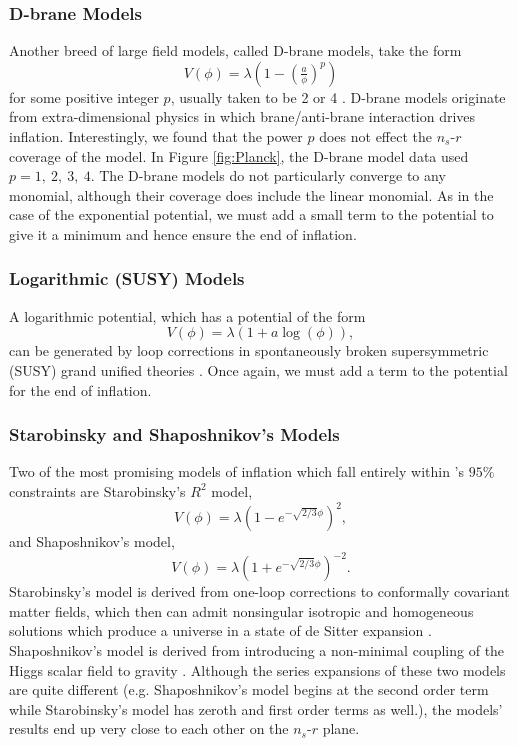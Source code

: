 \documentclass[a4paper,11pt]{article}
\def\nsr{$n_s$-$r$ }
\begin{document}
\subsubsection{D-brane Models}
Another breed of large field models, called D-brane models, take the form 
\begin{equation}
V(\phi)=\lambda(1-(\tfrac{a}{\phi})^p)
\end{equation} 
for some positive integer $p$, usually taken to be 2 \citep{Garcia+2002} or 4 \citep{Dvali+Tye1999}. D-brane models originate from extra-dimensional physics in which brane/anti-brane interaction drives inflation. Interestingly, we found that the power $p$ does not effect the \nsr coverage of the model. In Figure \ref{fig:Planck}, the D-brane model data used $p=1,\ 2,\ 3,\ 4$. The D-brane models do not particularly converge to any monomial, although their coverage does include the linear monomial. As in the case of the exponential potential, we must add a small term to the potential to give it a minimum and hence ensure the end of inflation.

\subsubsection{Logarithmic (SUSY) Models}
A logarithmic potential, which has a potential of the form 
\begin{equation}
V(\phi)=\lambda(1+a\log(\phi)),
\end{equation} 
can be generated by loop corrections in spontaneously broken supersymmetric (SUSY) grand unified theories \citep{Dvali+1994}. Once again, we must add a term to the potential for the end of inflation. 


\subsubsection{Starobinsky and Shaposhnikov's Models}
Two of the most promising models of inflation which fall entirely within \citet{Planck2015}'s $95\%$ constraints are Starobinsky's $R^2$ model, 
\begin{equation}
V(\phi)=\lambda\left(1-e^{-\sqrt{2/3}\phi}\right)^2,
\end{equation} 
and Shaposhnikov's model, 
\begin{equation}
V(\phi)=\lambda \left(1+e^{-\sqrt{2/3}\phi}\right)^{-2}.
\end{equation} 
Starobinsky's model is derived from one-loop corrections to conformally covariant matter fields, which then can admit nonsingular isotropic and homogeneous solutions which produce a universe in a state of de Sitter expansion \citep{Starobinsky1980}. Shaposhnikov's model is derived from introducing a non-minimal coupling of the Higgs scalar field to gravity \citep{Bezrukov+Shaposhnikov2008}. Although the series expansions of these two models are quite different (e.g. Shaposhnikov's model begins at the second order term while Starobinsky's model has zeroth and first order terms as well.), the models' results end up very close to each other on the \nsr plane.
\end{document}
